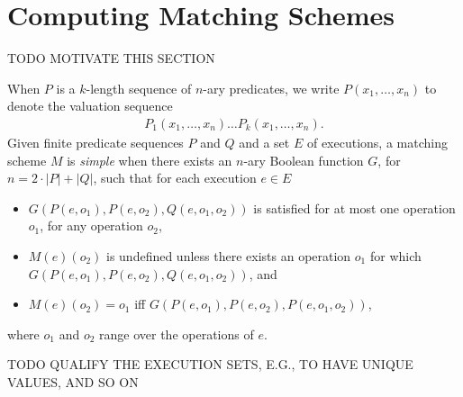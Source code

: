 \section{Computing Matching Schemes}
\label{sec:matching}

TODO MOTIVATE THIS SECTION

When $P$ is a $k$-length sequence of $n$-ary predicates, we write $P(x_1,
\ldots, x_n)$ to denote the valuation sequence
\begin{align*}
  P_1(x_1, \ldots, x_n) \ldots P_k(x_1, \ldots, x_n).
\end{align*}
Given finite predicate sequences $P$ and $Q$ and a set $E$ of executions, a
matching scheme $M$ is \emph{simple} when there exists an $n$-ary Boolean
function $G$, for $n = 2\cdot|P|+|Q|$, such that for each execution $e \in E$
\begin{itemize}

  \item $G(P(e,o_1),P(e,o_2),Q(e,o_1,o_2))$ is satisfied for at most one
  operation $o_1$, for any operation $o_2$,

  \item $M(e)(o_2)$ is undefined unless there exists an operation $o_1$
  for which $G(P(e,o_1),P(e,o_2),Q(e,o_1,o_2))$, and

  \item $M(e)(o_2) = o_1$ if{f} $G(P(e,o_1),P(e,o_2),P(e,o_1,o_2))$,

\end{itemize}
where $o_1$ and $o_2$ range over the operations of $e$.

TODO QUALIFY THE EXECUTION SETS, E.G., TO HAVE UNIQUE VALUES, AND SO ON

